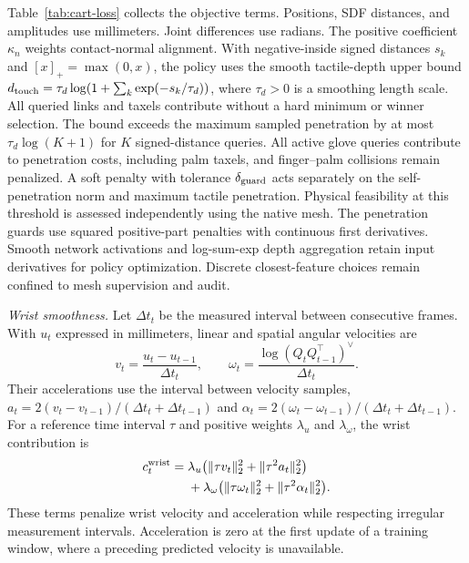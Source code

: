 Table~\ref{tab:cart-loss} collects the objective terms. Positions, SDF distances, and amplitudes use millimeters. Joint differences use radians. The positive coefficient $\kappa_n$ weights contact-normal alignment. With negative-inside signed distances $s_k$ and $[x]_+=\max(0,x)$, the policy uses the smooth tactile-depth upper bound $d_{\rm touch}=\tau_d\log(1+\sum_k\exp(-s_k/\tau_d))$, where $\tau_d>0$ is a smoothing length scale. All queried links and taxels contribute without a hard minimum or winner selection. The bound exceeds the maximum sampled penetration by at most $\tau_d\log(K+1)$ for $K$ signed-distance queries. All active glove queries contribute to penetration costs, including palm taxels, and finger--palm collisions remain penalized. A soft penalty with tolerance $\delta_{\rm guard}$ acts separately on the self-penetration norm and maximum tactile penetration. Physical feasibility at this threshold is assessed independently using the native mesh. The penetration guards use squared positive-part penalties with continuous first derivatives. Smooth network activations and log-sum-exp depth aggregation retain input derivatives for policy optimization. Discrete closest-feature choices remain confined to mesh supervision and audit.

\textit{Wrist smoothness.} Let $\Delta t_t$ be the measured interval between consecutive frames. With $u_t$ expressed in millimeters, linear and spatial angular velocities are
\begin{equation}
    v_t=\frac{u_t-u_{t-1}}{\Delta t_t},\qquad
    \omega_t=\frac{\log(Q_tQ_{t-1}^\top)^\vee}{\Delta t_t}.
    \label{eq:cart-wrist-velocity}
\end{equation}
Their accelerations use the interval between velocity samples, $a_t=2(v_t-v_{t-1})/(\Delta t_t+\Delta t_{t-1})$ and $\alpha_t=2(\omega_t-\omega_{t-1})/(\Delta t_t+\Delta t_{t-1})$. For a reference time interval $\tau$ and positive weights $\lambda_u$ and $\lambda_\omega$, the wrist contribution is
\begin{equation}
\begin{aligned}
    c_t^{\rm wrist}
    ={}&\lambda_u\bigl(\|\tau v_t\|_2^2+\|\tau^2 a_t\|_2^2\bigr)\\
       &+\lambda_\omega\bigl(\|\tau\omega_t\|_2^2
                         +\|\tau^2\alpha_t\|_2^2\bigr).
\end{aligned}
    \label{eq:cart-wrist-smooth}
\end{equation}
These terms penalize wrist velocity and acceleration while respecting irregular measurement intervals. Acceleration is zero at the first update of a training window, where a preceding predicted velocity is unavailable.

